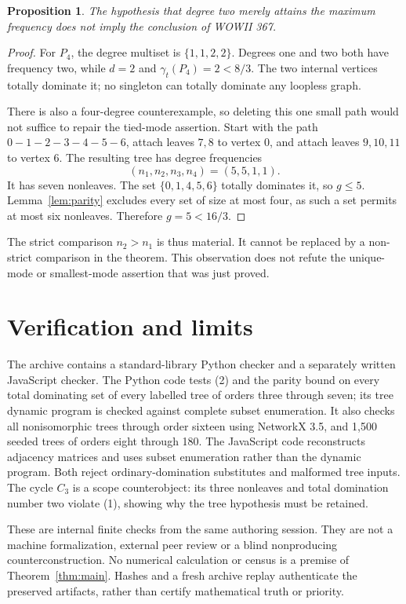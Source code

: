 \documentclass[11pt,a4paper]{article}
\newtheorem{proposition}[theorem]{Proposition}
\newcommand{\gt}{\gamma_t}
\begin{document}
\begin{proposition}
The hypothesis that degree two merely attains the maximum frequency does not imply the conclusion of WOWII 367.
\end{proposition}
\begin{proof}
For $P_4$, the degree multiset is $\{1,1,2,2\}$. Degrees one and two both have frequency two, while $d=2$ and $\gt(P_4)=2<8/3$. The two internal vertices totally dominate it; no singleton can totally dominate any loopless graph.

There is also a four-degree counterexample, so deleting this one small path would not suffice to repair the tied-mode assertion. Start with the path $0-1-2-3-4-5-6$, attach leaves $7,8$ to vertex $0$, and attach leaves $9,10,11$ to vertex $6$. The resulting tree has degree frequencies
\[
 (n_1,n_2,n_3,n_4)=(5,5,1,1).
\]
It has seven nonleaves. The set $\{0,1,4,5,6\}$ totally dominates it, so $g\le5$. Lemma~\ref{lem:parity} excludes every set of size at most four, as such a set permits at most six nonleaves. Therefore $g=5<16/3$.
\end{proof}

The strict comparison $n_2>n_1$ is thus material. It cannot be replaced by a non-strict comparison in the theorem. This observation does not refute the unique-mode or smallest-mode assertion that was just proved.

\section{Verification and limits}
The archive contains a standard-library Python checker and a separately written JavaScript checker. The Python code tests (2) and the parity bound on every total dominating set of every labelled tree of orders three through seven; its tree dynamic program is checked against complete subset enumeration. It also checks all nonisomorphic trees through order sixteen using NetworkX 3.5, and 1,500 seeded trees of orders eight through 180. The JavaScript code reconstructs adjacency matrices and uses subset enumeration rather than the dynamic program. Both reject ordinary-domination substitutes and malformed tree inputs. The cycle $C_3$ is a scope counterobject: its three nonleaves and total domination number two violate (1), showing why the tree hypothesis must be retained.

These are internal finite checks from the same authoring session. They are not a machine formalization, external peer review or a blind nonproducing counterconstruction. No numerical calculation or census is a premise of Theorem~\ref{thm:main}. Hashes and a fresh archive replay authenticate the preserved artifacts, rather than certify mathematical truth or priority.
\end{document}
